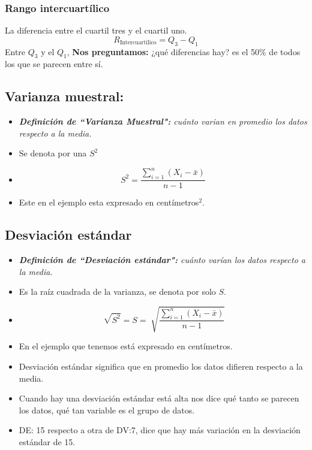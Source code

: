 
\subsubsection{Rango intercuartílico}
La diferencia entre el cuartil tres y el cuartil uno.
\[
   R_{\text{Intercuartílico}} = Q_{3} - Q_{1}
\]
Entre $Q_{3}$ y el $Q_{1}$, \textbf{Nos preguntamos:} ¿qué diferencias hay? es el 50\% de todos los que se parecen entre sí.

\subsection{Varianza muestral:}
\begin{itemize}
    \item \emph{\textbf{Definición de ``Varianza Muestral":} cuánto varian en promedio los datos respecto a la media.}
    \item Se denota por una $S^2$
    \item \[
        S^2 = \frac{\sum_{i=1}^{n}(X_{i}-\bar{x})}{n-1} 
      \]     
    
    \item Este en el ejemplo esta expresado en centímetros$^2$. 
\end{itemize}


\subsection{Desviación estándar}
\begin{itemize}
    \item \emph{\textbf{Definición de ``Desviación estándar":} cuánto varían los datos respecto a la media.}
    \item Es la raíz cuadrada de la varianza, se denota por solo $S$.
    \item \[
      \sqrt[]{S^2}  = S = \sqrt[]{ \frac{\sum_{i=1}^{n}(X_{i}-\bar{x})}{n-1} }
    \]
    
    \item En el ejemplo que tenemos está expresado en centímetros.
    \item Desviación estándar significa que en promedio los datos difieren respecto a la media.
    \item Cuando hay una desviación estándar está alta nos dice qué tanto se parecen los datos, qué tan variable es el grupo de datos.
    \item DE: 15 respecto a otra de DV:7, dice que hay más variación en la desviación estándar de 15.
\end{itemize}

